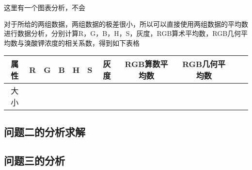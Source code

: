    这里有一个图表分析，不会

    对于所给的两组数据，两组数据的极差很小，所以可以直接使用两组数据的平均数进行数据分析，分别计算R，G，B，H，S，灰度，RGB算术平均数，RGB几何平均数与溴酸钾浓度的相关系数，得到如下表格

    \begin{table}
        \begin{tabular}{|c|c|c|c|c|c|c|c|c|c|c|}
            \hline         
            属性 & R & G & B & H & S & 灰度 & RGB算数平均数 & RGB几何平均数 \\
        \hline
            大小 & 
        \end{tabular}
    \end{table}


\subsection{问题二的分析求解}

\subsection{问题三的分析}
